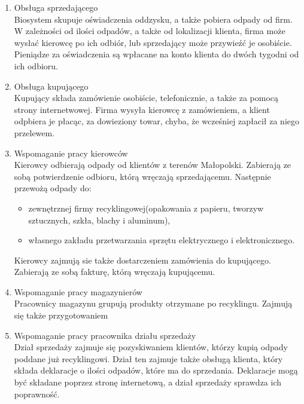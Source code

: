 

\begin{enumerate}
	\item Obsługa sprzedającego \\
	Biosystem skupuje oświadczenia oddzysku, a także pobiera odpady od firm. W zależności od ilości odpadów, a także od lokalizacji klienta, firma może wysłać kierowcę po ich odbiór, lub sprzedający może przywieźć je osobiście. Pieniądze za oświadczenia są wpłacane na konto klienta do dwóch tygodni od ich odbioru.
	\item Obsługa kupującego \\
	Kupujący składa zamówienie osobiście, telefonicznie, a także za pomocą strony internetwowej. Firma wysyła kierowcę z zamówieniem, a klient odpbiera je płacąc, za dowieziony towar, chyba, że wcześniej zapłacił za niego przelewem.
	\item Wspomaganie pracy kierowców \\
	Kierowcy odbierają odpady od klientów z terenów Małopolski. Zabierają ze sobą potwierdzenie odbioru, którą wręczają sprzedającemu. Następnie przewożą odpady do:
		\begin{itemize}
			\item zewnętrznej firmy recyklingowej(opakowania z papieru, tworzyw sztucznych, szkła, blachy i aluminum),
			\item własnego zakładu przetwarzania sprzętu elektrycznego i elektronicznego.
		\end{itemize}
	Kierowcy zajmują sie także dostarczeniem zamówienia do kupującego. Zabierają ze sobą fakturę, którą wręczają kupującemu.
	\item Wspomaganie pracy magazynierów \\
	Pracownicy magazynu grupują produkty otrzymane po recyklingu. Zajmują się także przygotowaniem 
	\item Wspomaganie pracy pracownika działu sprzedaży \\
	Dział sprzedaży zajmuje się pozyskiwaniem klientów, którzy kupią odpady poddane już recyklingowi. Dział ten zajmuje także obsługą klienta, który składa deklaracje o ilości odpadów, które ma do sprzedania. Deklaracje mogą być składane poprzez stronę internetową, a dział sprzedaży sprawdza ich poprawność.
\end{enumerate}
